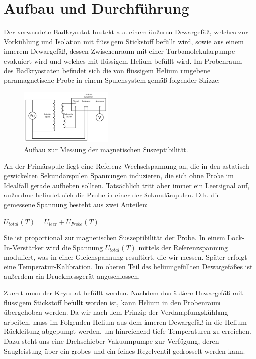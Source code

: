 \documentclass[bigchapter,colorback,accentcolor=tud4b,linedtoc,11pt]{tudreport}
\begin{document}
\chapter{Aufbau und Durchführung}

Der verwendete Badkryostat besteht aus einem äußeren Dewargefäß, welches zur Vorkühlung und Isolation mit flüssigem Stickstoff befüllt wird, sowie aus einem innerem Dewargefäß, dessen Zwischenraum mit einer Turbomolekularpumpe evakuiert wird und welches mit flüssigem Helium befüllt wird. Im Probenraum des Badkryostaten befindet sich die von flüssigem Helium umgebene paramagnetische Probe in einem Spulensystem gemäß folgender Skizze: 

\begin{figure}[h] 
  \centering
     \includegraphics[width=0.4\textwidth]{data/Aufbau.jpg}
  \caption{Aufbau zur Messung der magnetischen Suszeptibilität. \cite{anleitung}}  
  \label{fig:Bild1}
\end{figure}


An der Primärspule liegt eine Referenz-Wechselspannung an, die in den astatisch gewickelten Sekundärspulen Spannungen induzieren, die sich ohne Probe im Idealfall gerade aufheben sollten. Tatsächlich tritt aber immer ein Leersignal auf, außerdme befindet sich die Probe in einer der Sekundärspulen. D.h. die gemessene Spannung besteht aus zwei Anteilen: 
\begin{center}
    $U_{total}(T) = U_{leer} + U_{Probe}(T)$
\end{center}


Sie ist proportional zur magnetischen Suszeptibilität der Probe. In einem Lock-In-Verstärker wird die Spannung $U_{total}(T)$ mittels der Referenzspannung moduliert, was in einer Gleichspannung resultiert, die wir messen. Später erfolgt eine Temperatur-Kalibration. Im oberen Teil des heliumgefüllten Dewargefäßes ist außerdem ein Druckmessgerät angeschlossen.

Zuerst muss der Kryostat befüllt werden. Nachdem das äußere Dewargefäß mit flüssigem Stickstoff befüllt worden ist, kann Helium in den Probenraum übergehoben werden. Da wir nach dem Prinzip der Verdampfungskühlung arbeiten, muss im Folgenden Helium aus dem inneren Dewargefäß in die Helium-Rückleitung abgepumpt werden, um hinreichend tiefe Temperaturen zu erreichen. Dazu steht uns eine Drehschieber-Vakuumpumpe zur Verfügung, deren Saugleistung über ein grobes und ein feines Regelventil gedrosselt werden kann. 
\end{document}
